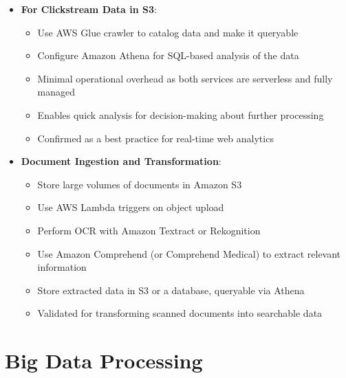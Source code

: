 \documentclass[11pt,a4paper]{report}
\begin{document}
\begin{itemize}
  \item \textbf{For Clickstream Data in S3}:
\begin{itemize}
  \item Use AWS Glue crawler to catalog data and make it queryable
  \item Configure Amazon Athena for SQL-based analysis of the data
  \item Minimal operational overhead as both services are serverless and fully managed
  \item Enables quick analysis for decision-making about further processing
  \item Confirmed as a best practice for real-time web analytics
\end{itemize}
  \item \textbf{Document Ingestion and Transformation}:
\begin{itemize}
  \item Store large volumes of documents in Amazon S3
  \item Use AWS Lambda triggers on object upload
  \item Perform OCR with Amazon Textract or Rekognition
  \item Use Amazon Comprehend (or Comprehend Medical) to extract relevant information
  \item Store extracted data in S3 or a database, queryable via Athena
  \item Validated for transforming scanned documents into searchable data
\end{itemize}
\end{itemize}


\section{Big Data Processing}
\end{document}
